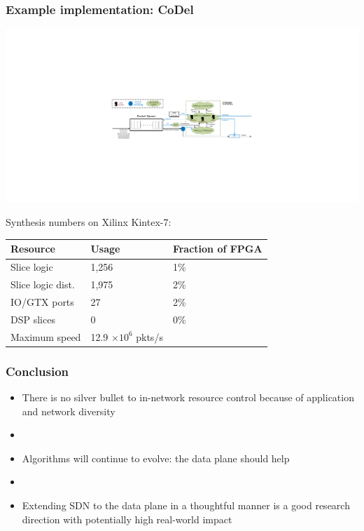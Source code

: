 \begin{frame}[plain]
\frametitle{Example implementation: CoDel}
\begin{center}
\includegraphics[width=\columnwidth]{codel.pdf}
\end{center}
\begin{center}
Synthesis numbers on Xilinx Kintex-7: \\
\begin{tabular}{lll}
\bf Resource & \bf Usage & \bf Fraction of FPGA \\
\hline Slice logic & 1,256 & 1\% \\
Slice logic dist. & 1,975 & 2\% \\
IO/GTX ports & 27 & 2\% \\
DSP slices & 0 & 0\% \\
Maximum speed & 12.9 $\times 10^6$ pkts/s \\
\end{tabular}
\end{center}
\end{frame}


\begin{frame}[plain]
\frametitle{Conclusion}
\begin{itemize}

\item There is no silver bullet to in-network resource control because
  of application and network diversity

\item[]
\item Algorithms will continue to evolve: the data plane should help

\item[]
\item Extending SDN to the data plane in a thoughtful manner is a good
  research direction with potentially high real-world impact

\end{itemize}
\end{frame}

